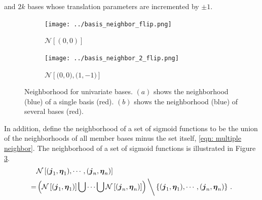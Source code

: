 and $2k$ bases whose translation parameters are incremented by $\pm 1$.
\begin{figure}[Htbp]\begin{center}
    \begin{subfigure}[p]{1.\textwidth}
        \centering
        \texttt{[image: ../basis\_neighbor\_flip.png]}
        \caption{$\mathcal{N}\left[\left(0,0\right)\right]$}
        \label{fig: basis neighbor}
    \end{subfigure}
    \begin{subfigure}[p]{1.\textwidth}
        \centering
        \texttt{[image: ../basis\_neighbor\_2\_flip.png]}
        \caption{$\mathcal{N}\left[ \big(0, 0\big), \big(1, -1\big)
                 \right]$}
        \label{fig: union neighbor}
    \end{subfigure}
    \caption{Neighborhood for univariate bases. 
             $(a)$ shows the neighborhood (blue)
             of a single basis (red).  $(b)$ shows the neighborhood (blue) 
             of several bases (red).}
\end{center}\end{figure}
In addition, define the neighborhood of a set of sigmoid functions to be the union
of the neighborhoods of all member bases minus the set itself, 
\eqref{eqn: multiple neighbor}. The neighborhood of 
a set of sigmoid functions
is illustrated in Figure \ref{fig: union neighbor}.
\begin{equation}\begin{split}
    &\mathcal{N}\left[(\boldsymbol{j}_1, \boldsymbol{\eta}_1), \cdots, 
    ( \boldsymbol{j}_n, \boldsymbol{\eta}_n) \right]\\
    = &\left( \mathcal{N}\left[(\boldsymbol{j}_1, \boldsymbol{\eta}_1)\right]\bigcup \cdots 
      \bigcup \mathcal{N}\left[(\boldsymbol{j}_n, \boldsymbol{\eta}_n)\right]\right)
      \bigg\backslash \left\{(\boldsymbol{j}_1, \boldsymbol{\eta}_1), \cdots, 
      ( \boldsymbol{j}_n, \boldsymbol{\eta}_n) \right\}\,.
\label{eqn: multiple neighbor}
\end{split}\end{equation}\\

